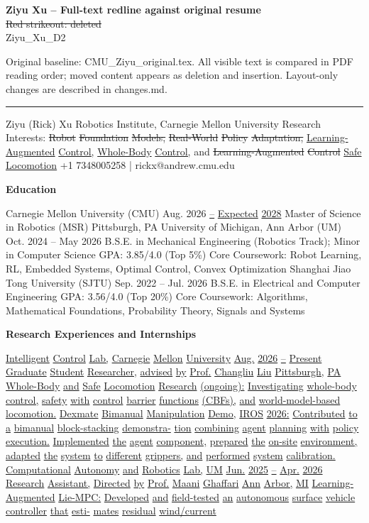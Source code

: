 \documentclass[10pt,letterpaper]{article}
\newcommand{\del}[1]{{\color{red}\sout{#1}}}
\newcommand{\add}[1]{{\color{blue}\uline{#1}}}
\begin{document}
\textbf{Ziyu Xu -- Full-text redline against original resume}\\
\del{Red strikeout: deleted} \quad \add{Blue underline: added}\\
Ziyu\_Xu\_D2\par
Original baseline: CMU\_Ziyu\_original.tex. All visible text is compared in PDF reading order; moved content appears as deletion and insertion. Layout-only changes are described in changes.md.
\hrule\medskip
Ziyu (Rick) Xu Robotics Institute, Carnegie Mellon University Research Interests: \del{Robot} \del{Foundation} \del{Models,} \del{Real-World} \del{Policy} \del{Adaptation,} \add{Learning-Augmented} \add{Control,} \add{Whole-Body} \add{Control,} and \del{Learning-Augmented} \del{Control} \add{Safe} \add{Locomotion} +1 7348005258 | rickx@andrew.cmu.edu \par\medskip\textbf{Education}\par  Carnegie Mellon University (CMU) Aug. 2026 \add{--} \add{Expected} \add{2028} Master of Science in Robotics (MSR) Pittsburgh, PA University of Michigan, Ann Arbor (UM) Oct. 2024 -- May 2026 B.S.E. in Mechanical Engineering (Robotics Track); Minor in Computer Science GPA: 3.85/4.0 (Top 5\%)  Core Coursework: Robot Learning, RL, Embedded Systems, Optimal Control, Convex Optimization Shanghai Jiao Tong University (SJTU) Sep. 2022 -- Jul. 2026 B.S.E. in Electrical and Computer Engineering GPA: 3.56/4.0 (Top 20\%)  Core Coursework: Algorithms, Mathematical Foundations, Probability Theory, Signals and Systems \par\medskip\textbf{Research Experiences and Internships}\par  \add{Intelligent} \add{Control} \add{Lab,} \add{Carnegie} \add{Mellon} \add{University} \add{Aug.} \add{2026} \add{--} \add{Present} \add{Graduate} \add{Student} \add{Researcher,} \add{advised} \add{by} \add{Prof.} \add{Changliu} \add{Liu} \add{Pittsburgh,} \add{PA} \add{} \add{Whole-Body} \add{and} \add{Safe} \add{Locomotion} \add{Research} \add{(ongoing):} \add{Investigating} \add{whole-body} \add{control,} \add{safety} \add{with} \add{control} \add{barrier} \add{functions} \add{(CBFs),} \add{and} \add{world-model-based} \add{locomotion.} \add{} \add{Dexmate} \add{Bimanual} \add{Manipulation} \add{Demo,} \add{IROS} \add{2026:} \add{Contributed} \add{to} \add{a} \add{bimanual} \add{block-stacking} \add{demonstra-} \add{tion} \add{combining} \add{agent} \add{planning} \add{with} \add{policy} \add{execution.} \add{Implemented} \add{the} \add{agent} \add{component,} \add{prepared} \add{the} \add{on-site} \add{environment,} \add{adapted} \add{the} \add{system} \add{to} \add{different} \add{grippers,} \add{and} \add{performed} \add{system} \add{calibration.} \add{Computational} \add{Autonomy} \add{and} \add{Robotics} \add{Lab,} \add{UM} \add{Jun.} \add{2025} \add{--} \add{Apr.} \add{2026} \add{Research} \add{Assistant,} \add{Directed} \add{by} \add{Prof.} \add{Maani} \add{Ghaffari} \add{Ann} \add{Arbor,} \add{MI} \add{} \add{Learning-Augmented} \add{Lie-MPC:} \add{Developed} \add{and} \add{field-tested} \add{an} \add{autonomous} \add{surface} \add{vehicle} \add{controller} \add{that} \add{esti-} \add{mates} \add{residual} \add{wind/current} 
\end{document}
